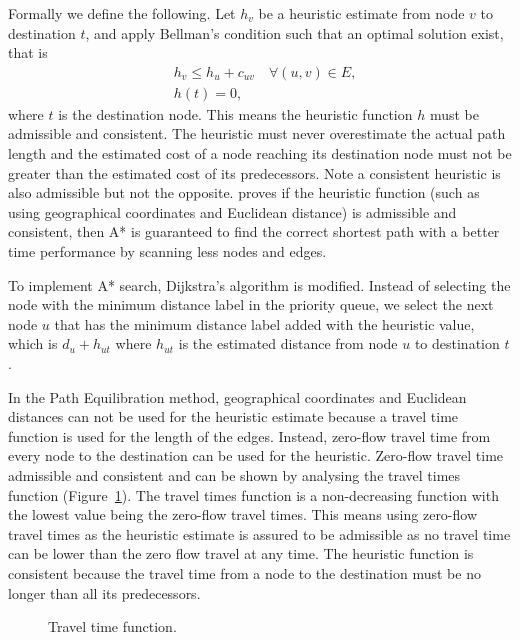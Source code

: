 Formally we define the following.
Let $h_v$ be a heuristic estimate from node $v$ to destination $t$,
and apply Bellman's condition such that an optimal solution exist, that is 
\begin{align}
    &h_v \leq h_u + c_{uv} \quad \forall(u,v) \in E, \\
    &h(t) = 0,
\end{align}
where $t$ is the destination node.
This means the heuristic function $h$ must be admissible and consistent.
The heuristic must never overestimate the actual path length and the estimated cost of a node reaching its destination node must not be greater than the estimated cost of its predecessors.
Note a consistent heuristic is also admissible but not the opposite.
\citet{Astar} proves if the heuristic function (such as using geographical coordinates and Euclidean distance) is admissible and consistent,
then A* is guaranteed to find the correct shortest path with a better time performance by scanning less nodes and edges.

To implement A* search,
Dijkstra's algorithm is modified.
Instead of selecting the node with the minimum distance label in the priority queue,
we select the next node $u$ that has the minimum distance label added with the heuristic value, which is $d_u + h_{ut}$ where $h_{ut}$ is the estimated distance from node $u$ to destination $t$.

In the Path Equilibration method,
geographical coordinates and Euclidean distances can not be used for the heuristic estimate because a travel time function is used for the length of the edges.
Instead, zero-flow travel time from every node to the destination can be used for the heuristic.
Zero-flow travel time admissible and consistent and can be shown by
analysing the travel times function (Figure~\ref{fig:flowfunction}).
The travel times function is a non-decreasing function with the lowest value being the zero-flow travel times.
This means using zero-flow travel times as the heuristic estimate
is assured to be admissible
as no travel time can be lower than the zero flow travel at any time.
The heuristic function is consistent because the travel time from a node to the destination must be no longer than all its predecessors.

\begin{figure}[H]
    \centering
    \caption{Travel time function.}
    \label{fig:flowfunction}
\end{figure}

